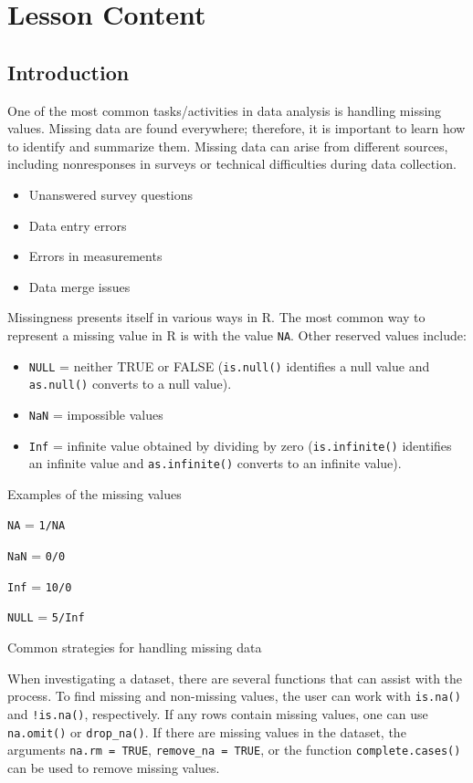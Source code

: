 \documentclass[
  letterpaper,
  DIV=11,
  numbers=noendperiod]{scrreprt}
\providecommand{\tightlist}{%
  \setlength{\itemsep}{0pt}\setlength{\parskip}{0pt}}\usepackage{longtable,booktabs,array}
\begin{document}
\section{Lesson Content}\label{lesson-content-11}

\subsection{Introduction}\label{introduction-9}

One of the most common tasks/activities in data analysis is handling
missing values. Missing data are found everywhere; therefore, it is
important to learn how to identify and summarize them. Missing data can
arise from different sources, including nonresponses in surveys or
technical difficulties during data collection.

\begin{itemize}
\tightlist
\item
  Unanswered survey questions
\item
  Data entry errors
\item
  Errors in measurements
\item
  Data merge issues
\end{itemize}

Missingness presents itself in various ways in R. The most common way to
represent a missing value in R is with the value \texttt{NA}. Other
reserved values include:

\begin{itemize}
\item
  \texttt{NULL} = neither TRUE or FALSE (\texttt{is.null()} identifies a
  null value and \texttt{as.null()} converts to a null value).
\item
  \texttt{NaN} = impossible values
\item
  \texttt{Inf} = infinite value obtained by dividing by zero
  (\texttt{is.infinite()} identifies an infinite value and
  \texttt{as.infinite()} converts to an infinite value).
\end{itemize}

Examples of the missing values

\texttt{NA} = \texttt{1/NA}

\texttt{NaN} = \texttt{0/0}

\texttt{Inf} = \texttt{10/0}

\texttt{NULL} = \texttt{5/Inf}

Common strategies for handling missing data

When investigating a dataset, there are several functions that can
assist with the process. To find missing and non-missing values, the
user can work with \texttt{is.na()} and \texttt{!is.na()}, respectively.
If any rows contain missing values, one can use \texttt{na.omit()} or
\texttt{drop\_na()}. If there are missing values in the dataset, the
arguments \texttt{na.rm\ =\ TRUE}, \texttt{remove\_na\ =\ TRUE}, or the
function \texttt{complete.cases()} can be used to remove missing values.
\end{document}
